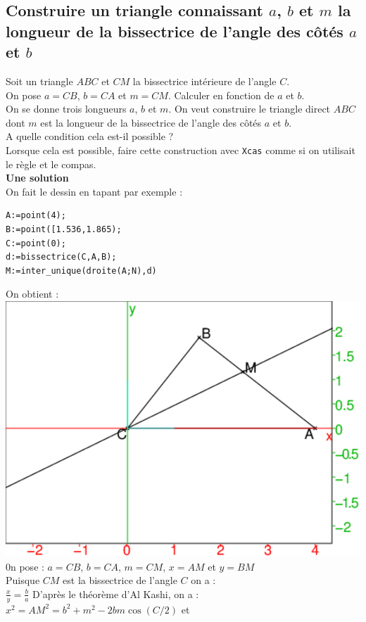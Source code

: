 \documentclass[a4paper,11pt]{book}
\begin{document}
\subsection{Construire un triangle connaissant $a$, $b$ et $m$ la longueur de la bissectrice de l'angle des c\^ot\'es $a$ et $b$}
Soit un triangle $ABC$ et $CM$ la bissectrice int\'erieure de l'angle $C$.\\
On pose $a=CB$, $b=CA$ et $m=CM$. Calculer en fonction de $a$ et $b$.\\
On se donne trois longueurs $a$, $b$ et $m$. On veut construire le triangle 
direct $ABC$ dont $m$ est la longueur de la bissectrice de l'angle des 
c\^ot\'es $a$ et $b$.\\
A quelle condition cela est-il possible ?\\
Lorsque cela est possible, faire cette construction avec {\tt Xcas} comme si on
 utilisait le r\`egle et le compas.\\
{\bf Une solution}\\
On fait le dessin en tapant par exemple :
\begin{verbatim}
A:=point(4);
B:=point([1.536,1.865);
C:=point(0);
d:=bissectrice(C,A,B);
M:=inter_unique(droite(A;N),d)
\end{verbatim}
On obtient :
\includegraphics[width=\textwidth]{bissect0}
0n pose : $a=CB$, $b=CA$, $m=CM$, $x=AM$ et $y=BM$\\
Puisque $CM$ est la bissectrice de l'angle $C$ on a :\\
$\displaystyle \frac{x}{y}=\frac{b}{a}$
D'apr\`es le th\'eor\`eme d'Al Kashi, on a :\\
$x^2=AM^2=b^2+m^2-2bm\cos(C/2)$ et\\
\end{document}
